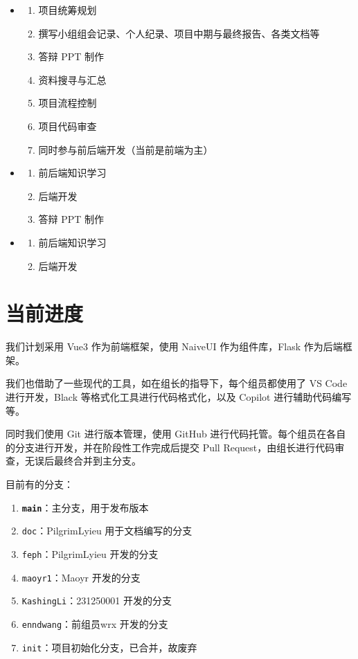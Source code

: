\documentclass[
    UTF8,
    12pt,
    oneside,
    a4paper
]{ctexart}
\begin{document}
\begin{itemize}
    \item \textbf{\wo}
        \begin{enumerate}
            \item 项目统筹规划
            \item 撰写小组组会记录、个人纪录、项目中期与最终报告、各类文档等
            \item 答辩 PPT 制作
            \item 资料搜寻与汇总
            \item 项目流程控制
            \item 项目代码审查
            \item 同时参与前后端开发（当前是前端为主）
        \end{enumerate}
    \item \vi
        \begin{enumerate}
            \item 前后端知识学习
            \item 后端开发
            \item 答辩 PPT 制作
        \end{enumerate}
    \item \rr
        \begin{enumerate}
            \item 前后端知识学习
            \item 后端开发
        \end{enumerate}
\end{itemize}

\section{当前进度}

我们计划采用 Vue3 作为前端框架，使用 NaiveUI 作为组件库，Flask 作为后端框架。

我们也借助了一些现代的工具，如在组长的指导下，每个组员都使用了 VS Code 进行开发，Black 等格式化工具进行代码格式化，以及 Copilot 进行辅助代码编写等。

同时我们使用 Git 进行版本管理，使用 GitHub 进行代码托管。每个组员在各自的分支进行开发，并在阶段性工作完成后提交 Pull Request，由组长进行代码审查，无误后最终合并到主分支。

目前有的分支：

\begin{enumerate}
    \item \textbf{\texttt{main}}：主分支，用于发布版本
    \item \texttt{doc}：\wo \textsf{PilgrimLyieu} 用于文档编写的分支
    \item \texttt{feph}：\wo \textsf{PilgrimLyieu} 开发的分支
    \item \texttt{maoyr1}：\vi \textsf{Maoyr} 开发的分支
    \item \texttt{KashingLi}：\rr \textsf{231250001} 开发的分支
    \item \texttt{enndwang}：前组员\tv \textsf{wrx} 开发的分支
    \item \texttt{init}：项目初始化分支，已合并，故废弃
\end{enumerate}
\end{document}

